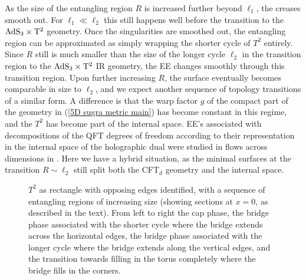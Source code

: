 \documentclass[11 pt]{article}
\begin{document}
As the size of the entangling region $R$ is increased further beyond $\ell_1$, the creases smooth out. For $\ell_1\ll \ell_2$ this still happens well before the transition to the $\rm AdS_3\times T^2$ geometry. Once the singularities are smoothed out, the entangling region can be approximated as simply wrapping the shorter cycle of $T^2$ entirely. Since $R$ still is much smaller than the size of the longer cycle $\ell_2$ in the transition region to the  $\rm AdS_3\times T^2$ IR geometry, the EE changes smoothly through this transition region. Upon further increasing $R$, the surface eventually becomes comparable in size to $\ell_2$, and we expect another sequence of topology transitions of a similar form.
A difference is that the warp factor $g$ of the compact part of the geometry in (\ref{5D sugra metric main}) has become constant in this regime, and the $T^2$ has become part of the internal space. EE's associated with decompositions of the QFT degrees of freedom according to their representation in the internal space of the holographic dual were studied in flows across dimensions in \cite{Uhlemann:2021itz}. Here we have a hybrid situation, as the minimal surfaces at the transition $R\sim\ell_2$ still split both the CFT$_d$ geometry and the internal space.

\begin{figure}
\centering
{}
\caption{$T^2$ as rectangle with opposing edges identified, with a sequence of entangling regions of increasing size (showing sections at $x=0$, as described in the text). From left to right the cap phase, the bridge phase associated with the shorter cycle where the bridge extends across the horizontal edges, the bridge phase associated with the longer cycle where the bridge extends along the vertical edges, and the transition towards filling in the torus completely where the bridge fills in the corners.\label{fig:torus-transitions}}
\end{figure}
\end{document}
